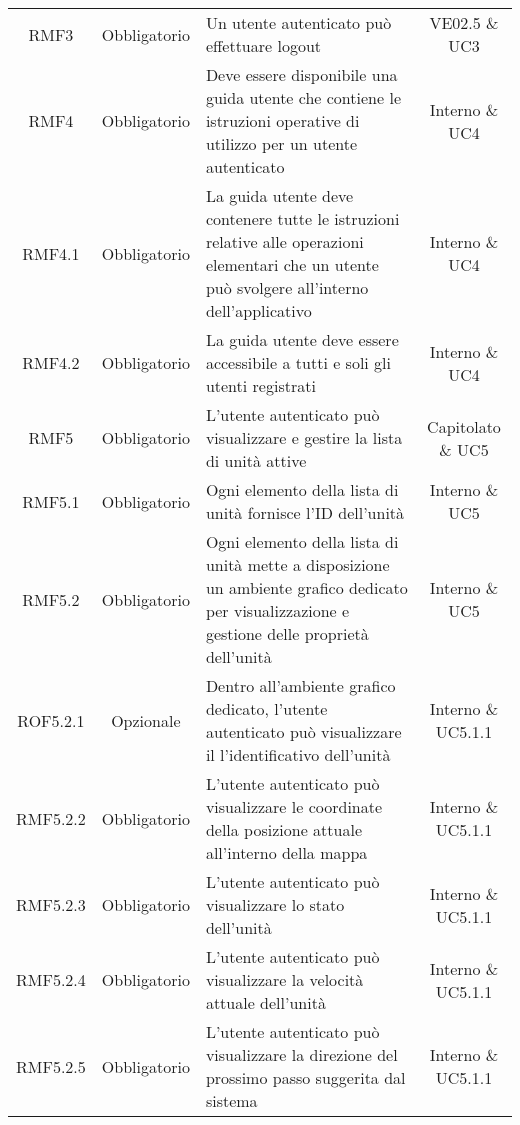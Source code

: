 \begin{longtable}[h!] { c c m{8cm} c}
		RMF3 & Obbligatorio & Un utente autenticato può effettuare logout & VE02.5 \& UC3 \\
		
		RMF4 & Obbligatorio & Deve essere disponibile una guida utente che contiene le istruzioni operative di utilizzo per un utente autenticato & Interno \& UC4 \\
		
		RMF4.1 & Obbligatorio & La guida utente deve contenere tutte le istruzioni relative alle operazioni elementari che un utente può svolgere all'interno dell'applicativo & Interno \& UC4 \\
		
		RMF4.2 & Obbligatorio & La guida utente deve essere accessibile a tutti e soli gli utenti registrati & Interno \& UC4 \\
		
		RMF5 & Obbligatorio & L'utente autenticato può visualizzare e gestire la lista di unità attive & Capitolato \& UC5 \\
		
		RMF5.1 & Obbligatorio & Ogni elemento della lista di unità fornisce l'ID dell'unità & Interno \& UC5 \\
		
		RMF5.2 & Obbligatorio & Ogni elemento della lista di unità mette a disposizione un ambiente grafico dedicato per visualizzazione e gestione delle proprietà dell'unità & Interno \& UC5 \\
		
		ROF5.2.1 & Opzionale & Dentro all'ambiente grafico dedicato, l'utente autenticato può visualizzare il l'identificativo dell'unità & Interno \& UC5.1.1 \\
		
		RMF5.2.2 & Obbligatorio & L'utente autenticato può visualizzare le coordinate della posizione attuale all'interno della mappa & Interno \& UC5.1.1 \\
		
		RMF5.2.3 & Obbligatorio & L'utente autenticato può visualizzare lo stato dell'unità & Interno \& UC5.1.1 \\
		
		RMF5.2.4 & Obbligatorio & L'utente autenticato può visualizzare la velocità attuale dell'unità & Interno \& UC5.1.1 \\
		
		RMF5.2.5 & Obbligatorio & L'utente autenticato può visualizzare la direzione del prossimo passo suggerita dal sistema & Interno \& UC5.1.1 \\
		

\end{longtable}
